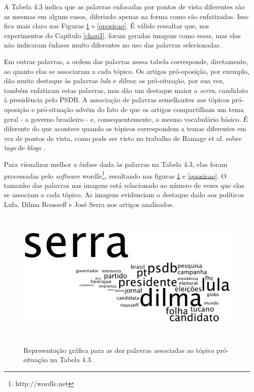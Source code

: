 
A Tabela 4.3 indica que as palavras enfocadas por pontos de vista diferentes são as mesmas em alguns casos, diferindo apenas na forma como são enfatizadas. Isso fica mais claro nas Figuras \ref{situacao} e \ref{oposicao}. É válido ressaltar que, nos experimentos do Capítulo \ref{chap3}, foram geradas imagens como essas, mas elas não indicaram ênfases muito diferentes no uso das palavras selecionadas. 

Em outras palavras, a ordem das palavras nessa tabela corresponde, diretamente, ao quanto elas se associaram a cada tópico. Os artigos pró-oposição, por exemplo, dão muito destaque às palavras \emph{lula} e \emph{dilma}; os pró-situação, por sua vez, também enfatizam estas palavras, mas dão um destaque maior a \emph{serra}, candidato à presidência pelo PSDB. A associação de palavras semelhantes aos tópicos pró-oposição e pró-situação advém do fato de que os artigos compartilham um tema geral - o governo brasileiro - e, consequentemente, o mesmo vocabulário básico. É diferente do que acontece quando os tópicos correspondem a temas diferentes em vez de pontos de vista, como pode ser visto no trabalho de Ramage et al. sobre \emph{tags} de \emph{blogs} \cite{llda}.

Para visualizar melhor a ênfase dada às palavras na Tabela 4.3, elas foram processadas pelo \emph{software} wordle\footnote{http://wordle.net}, resultando nas figuras \ref{situacao} e \ref{oposicao}. O tamanho das palavras nas imagens está relacionado ao número de vezes que elas se associam a cada tópico. As imagens evidenciam o destaque dado aos políticos Lula, Dilma Rousseff e José Serra nos artigos analisados. %

\begin{figure}[h]
  \centering %
  \includegraphics[width=12.5cm, height=6.5cm]{situacao.png}\\
  \caption{Representação gráfica para as dez palavras associadas ao tópico pró-situação na Tabela 4.3.}
  \label{situacao}
\end{figure}

